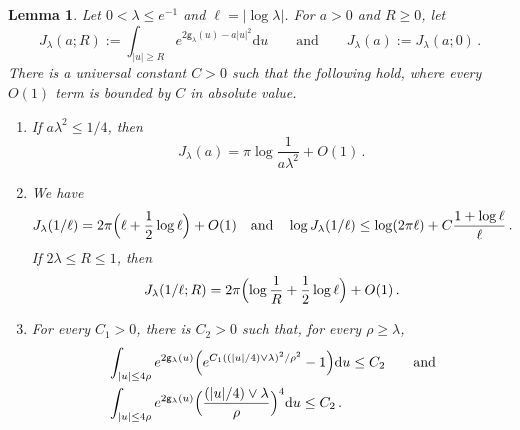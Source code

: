 \documentclass[a4paper,10pt,leqno]{amsart}
\numberwithin{equation}{section}
\newtheorem{lem}[prop]{Lemma}
\newcommand{\dd}{\mathrm{d}}
\def\g{\mathsf{g}}
\begin{document}
\begin{lem}\label{lem:critical radial}
  Let $0<\lambda\le e^{-1}$ and $\ell=|\log\lambda|$. For $a>0$ and $R\ge0$, let
  \[
    J_\lambda(a;R):=\int_{|u|\ge R}e^{2\g_\lambda(u)-a|u|^2}\dd u
    \qquad\text{and}\qquad
    J_\lambda(a):=J_\lambda(a;0)\,.
  \]
  There is a universal constant $C>0$ such that the following hold, where every $O(1)$ term is bounded by $C$ in absolute value.
  \begin{enumerate}
    \item If $a\lambda^2\le1/4$, then
    \begin{equation}\label{eq:critical-gaussian}
      J_\lambda(a)=\pi\log\frac1{a\lambda^2}+O(1)\,.
    \end{equation}
    \item We have
    \begin{equation}\label{eq:critical-B}
      J_\lambda(1/\ell)=2\pi\Bigl(\ell+\frac12\log\ell\Bigr)+O(1)
      \quad\text{and}\quad
      \log J_\lambda(1/\ell)\le\log(2\pi\ell)+C\frac{1+\log\ell}{\ell}\,.
    \end{equation}
    If $2\lambda\le R\le1$, then
    \begin{equation}\label{eq:critical-BR}
      J_\lambda(1/\ell;R)=2\pi\Bigl(\log\frac1R+\frac12\log\ell\Bigr)+O(1)\,.
    \end{equation}
    \item For every $C_1>0$, there is $C_2>0$ such that, for every $\rho\ge\lambda$,
    \begin{equation}\label{eq:critical-correction}
      \begin{aligned}
        &\int_{|u|\le4\rho}e^{2\g_\lambda(u)}\Bigl(e^{C_1((|u|/4)\vee\lambda)^2/\rho^2}-1\Bigr)\dd u\le C_2\qquad\text{and}\\
        &\int_{|u|\le4\rho}e^{2\g_\lambda(u)}\Bigl(\frac{(|u|/4)\vee\lambda}{\rho}\Bigr)^4\dd u\le C_2\,.
      \end{aligned}
    \end{equation}
  \end{enumerate}
\end{lem}
\end{document}
